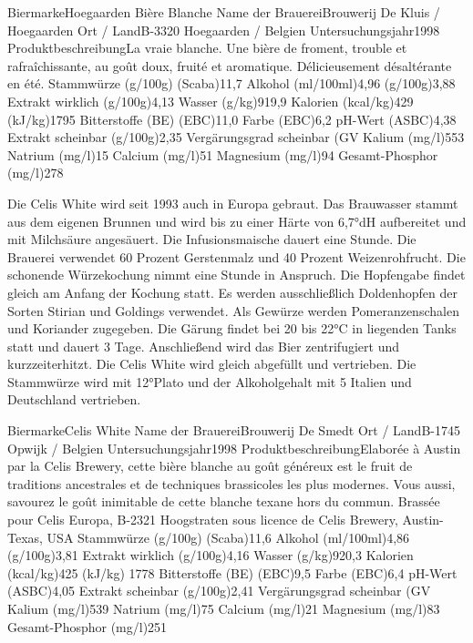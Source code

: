 \documentclass[a4paper,parskip=half]{scrartcl}
\begin{document}
\parencite[44]{Strottner1999}

BiermarkeHoegaarden Bière Blanche
Name der BrauereiBrouwerij De Kluis / Hoegaarden
Ort / LandB-3320 Hoegaarden / Belgien
Untersuchungsjahr1998
ProduktbeschreibungLa vraie blanche.
Une bière de froment, trouble et rafraîchissante,
au
goût
doux,
fruité
et
aromatique.
Délicieusement désaltérante en été.
Stammwürze (g/100g) (Scaba)11,7
Alkohol (ml/100ml)4,96
(g/100g)3,88
Extrakt wirklich (g/100g)4,13
Wasser (g/kg)919,9
Kalorien (kcal/kg)429
(kJ/kg)1795
Bitterstoffe (BE) (EBC)11,0
Farbe (EBC)6,2
pH-Wert (ASBC)4,38
Extrakt scheinbar (g/100g)2,35
Vergärungsgrad scheinbar (GV%
Kalium (mg/l)553
Natrium (mg/l)15
Calcium (mg/l)51
Magnesium (mg/l)94
Gesamt-Phosphor (mg/l)278

\parencite[49]{Strottner1999}

Die Celis White wird seit 1993 auch in Europa gebraut. Das Brauwasser stammt aus
dem eigenen Brunnen und wird bis zu einer Härte von 6,7°dH aufbereitet und mit
Milchsäure angesäuert. Die Infusionsmaische dauert eine Stunde. Die Brauerei
verwendet 60 Prozent Gerstenmalz und 40 Prozent Weizenrohfrucht.
Die schonende Würzekochung nimmt eine Stunde in Anspruch. Die Hopfengabe
findet gleich am Anfang der Kochung statt. Es werden ausschließlich Doldenhopfen
der
Sorten
Stirian
und
Goldings
verwendet.
Als
Gewürze
werden
Pomeranzenschalen und Koriander zugegeben.
Die Gärung findet bei 20 bis 22°C in liegenden Tanks statt und dauert 3 Tage.
Anschließend wird das Bier zentrifugiert und kurzzeiterhitzt. Die Celis White wird
gleich abgefüllt und vertrieben. Die Stammwürze wird mit 12°Plato und der
Alkoholgehalt mit 5 %
Italien und Deutschland vertrieben.

\parencite[50]{Strottner1999}

BiermarkeCelis White
Name der BrauereiBrouwerij De Smedt
Ort / LandB-1745 Opwijk / Belgien
Untersuchungsjahr1998
ProduktbeschreibungElaborée à Austin par la Celis Brewery, cette
bière blanche au goût généreux est le fruit de
traditions
ancestrales
et
de
techniques
brassicoles les plus modernes. Vous aussi,
savourez le goût inimitable de cette blanche
texane hors du commun.
Brassée pour Celis Europa, B-2321 Hoogstraten
sous licence de Celis Brewery, Austin-Texas,
USA
Stammwürze (g/100g) (Scaba)11,6
Alkohol (ml/100ml)4,86
(g/100g)3,81
Extrakt wirklich (g/100g)4,16
Wasser (g/kg)920,3
Kalorien (kcal/kg)425
(kJ/kg)
1778
Bitterstoffe (BE) (EBC)9,5
Farbe (EBC)6,4
pH-Wert (ASBC)4,05
Extrakt scheinbar (g/100g)2,41
Vergärungsgrad scheinbar (GV%
Kalium (mg/l)539
Natrium (mg/l)75
Calcium (mg/l)21
Magnesium (mg/l)83
Gesamt-Phosphor (mg/l)251
\end{document}
